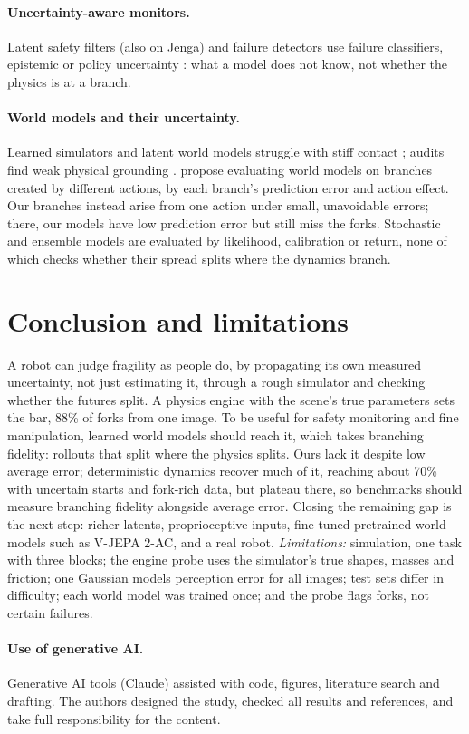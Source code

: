\documentclass{article}
\begin{document}
\paragraph{Uncertainty-aware monitors.} Latent safety filters (also on Jenga) and failure detectors use
failure classifiers, epistemic or policy uncertainty \citep{nakamura2025generalizing,seo2025uncertainty,xu2025failure,agia2024unpacking}:
what a model does not know, not whether the physics is at a branch.
\paragraph{World models and their uncertainty.} Learned simulators and latent world models
\citep{sanchezgonzalez2020learning,allen2023fignet,zhou2025dinowm,assran2025vjepa2,hafner2025dreamerv3}
struggle with stiff contact \citep{parmar2021fundamental}; audits find weak physical grounding
\citep{bear2021physion,motamed2026physicsiq,yang2026mirabench}.
\citet{yu2026evaluated} propose evaluating world models on branches created by different actions,
by each branch's prediction error and action effect. Our branches instead arise from one action under
small, unavoidable errors; there, our models have low prediction error but still miss the forks. Stochastic and ensemble models
\citep{chua2018pets,lakshminarayanan2017ensembles} are evaluated by likelihood, calibration or return,
none of which checks whether their spread splits where the dynamics branch.

\section{Conclusion and limitations}
A robot can judge fragility as people do, by propagating its own measured uncertainty, not just
estimating it, through a rough simulator and checking whether the futures split. A physics engine with the scene's true parameters sets the bar, 88\% of
forks from one image. To be useful for safety monitoring and fine manipulation, learned world models
should reach it, which takes branching fidelity: rollouts that split where the physics splits. Ours lack
it despite low average error; deterministic dynamics recover much of it, reaching about 70\% with uncertain
starts and fork-rich data, but plateau there, so
benchmarks should measure branching fidelity alongside average error. Closing the remaining gap is the next step:
richer latents, proprioceptive inputs, fine-tuned pretrained world models such as V-JEPA 2-AC, and a
real robot. \emph{Limitations:} simulation, one task with three blocks; the engine probe uses the simulator's
true shapes, masses and friction; one Gaussian models perception error for all images; test sets differ in
difficulty; each world model was trained once; and the probe flags forks, not certain failures.

\paragraph{Use of generative AI.} Generative AI tools (Claude) assisted with code, figures, literature
search and drafting. The authors designed the study, checked all results and references, and take full
responsibility for the content.


\end{document}
